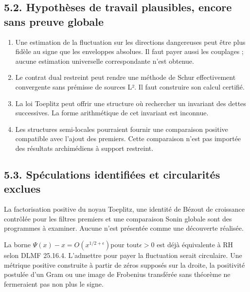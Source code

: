 \documentclass[
  10pt,
  a4paper,
]{article}
\providecommand{\tightlist}{%
  \setlength{\itemsep}{0pt}\setlength{\parskip}{0pt}}
\begin{document}
\hypertarget{hypothuxe8ses-de-travail-plausibles-encore-sans-preuve-globale}{%
\subsection{5.2. Hypothèses de travail plausibles, encore sans preuve
globale}\label{hypothuxe8ses-de-travail-plausibles-encore-sans-preuve-globale}}

\begin{enumerate}
\def\labelenumi{\arabic{enumi}.}
\tightlist
\item
  Une estimation de la fluctuation sur les directions dangereuses peut
  être plus fidèle au signe que les enveloppes absolues. Il faut payer
  aussi les couplages ; aucune estimation universelle correspondante
  n'est obtenue.
\item
  Le contrat dual restreint peut rendre une méthode de Schur
  effectivement convergente sans prémisse de sources L². Il faut
  construire son calcul certifié.
\item
  La loi Toeplitz peut offrir une structure où rechercher un invariant
  des dettes successives. La forme arithmétique de cet invariant est
  inconnue.
\item
  Les structures semi-locales pourraient fournir une comparaison
  positive compatible avec l'ajout des premiers. Cette comparaison n'est
  pas importée des résultats archimédiens à support restreint.
\end{enumerate}

\hypertarget{spuxe9culations-identifiuxe9es-et-circularituxe9s-exclues}{%
\subsection{5.3. Spéculations identifiées et circularités
exclues}\label{spuxe9culations-identifiuxe9es-et-circularituxe9s-exclues}}

La factorisation positive du noyau Toeplitz, une identité de Bézout de
croissance contrôlée pour les filtres premiers et une comparaison Sonin
globale sont des programmes à examiner. Aucune n'est présentée comme une
découverte réalisée.

La borne \(\Psi(x)-x=O(x^{1/2+\epsilon})\)pour tout\(\epsilon>0\) est
déjà équivalente à RH selon DLMF 25.16.4. L'admettre pour payer la
fluctuation serait circulaire. Une métrique positive construite à partir
de zéros supposés sur la droite, la positivité postulée d'un Gram ou une
image de Frobenius transférée sans théorème ne fermeraient pas non plus
le signe.
\end{document}
